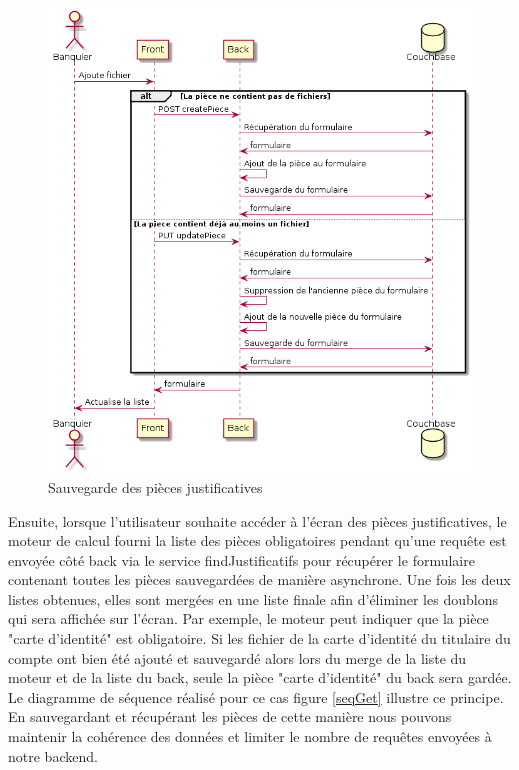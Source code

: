 \begin{figure}[h!]
	\includegraphics[scale=0.55]{images/travailBP1818/piecesJustif/seqSave.png}
	\centering
	\caption{Sauvegarde des pièces justificatives}
	\label{seqSave}
\end{figure}

	Ensuite, lorsque l'utilisateur souhaite accéder à l'écran des pièces justificatives, le moteur de calcul fourni la liste des pièces obligatoires pendant qu'une requête est envoyée côté back via le service findJustificatifs pour récupérer le formulaire contenant toutes les pièces sauvegardées de manière asynchrone. Une fois les deux listes obtenues, elles sont mergées en une liste finale afin d'éliminer les doublons qui sera affichée sur l'écran. Par exemple, le moteur peut indiquer que la pièce "carte d'identité" est obligatoire. Si les fichier de la carte d'identité du titulaire du compte ont bien été ajouté et sauvegardé alors lors du merge de la liste du moteur et de la liste du back, seule la pièce "carte d'identité" du back sera gardée. Le diagramme de séquence réalisé pour ce cas figure \ref{seqGet} illustre ce principe. En sauvegardant et récupérant les pièces de cette manière nous pouvons maintenir la cohérence des données et limiter le nombre de requêtes envoyées à notre backend. \\
	
